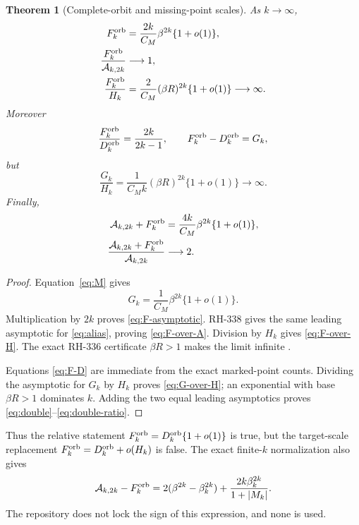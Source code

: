 \documentclass[11pt]{article}
\newtheorem{theorem}{Theorem}[section]
\theoremstyle{remark}
\newcommand{\cA}{\mathcal A}
\begin{document}
\begin{theorem}[Complete-orbit and missing-point scales]
\label{thm:scales}
As $k\to\infty$,
\begin{align}
 F_k^{\rm orb}
 &=\frac{2k}{C_M}\beta^{2k}\{1+o(1)\},
 \label{eq:F-asymptotic}\\
 \frac{F_k^{\rm orb}}{\cA_{k,2k}}&\longrightarrow1,
 \label{eq:F-over-A}\\
 \frac{F_k^{\rm orb}}{H_k}
 &=\frac2{C_M}(\beta R)^{2k}\{1+o(1)\}\longrightarrow\infty.
 \label{eq:F-over-H}
\end{align}
Moreover
\begin{equation}\label{eq:F-D}
 \frac{F_k^{\rm orb}}{D_k^{\rm orb}}=\frac{2k}{2k-1},
 \qquad F_k^{\rm orb}-D_k^{\rm orb}=G_k,
\end{equation}
but
\begin{equation}\label{eq:G-over-H}
 \frac{G_k}{H_k}
 =\frac1{C_Mk}(\beta R)^{2k}\{1+o(1)\}
 \longrightarrow\infty.
\end{equation}
Finally,
\begin{align}
 \cA_{k,2k}+F_k^{\rm orb}
 &=\frac{4k}{C_M}\beta^{2k}\{1+o(1)\},
 \label{eq:double}\\
 \frac{\cA_{k,2k}+F_k^{\rm orb}}{\cA_{k,2k}}
 &\longrightarrow2.
 \label{eq:double-ratio}
\end{align}
\end{theorem}

\begin{proof}
Equation~\eqref{eq:M} gives
\[
 G_k=\frac1{C_M}\beta^{2k}\{1+o(1)\}.
\]
Multiplication by $2k$ proves \eqref{eq:F-asymptotic}.  RH-338 gives the
same leading asymptotic for \eqref{eq:alias}, proving
\eqref{eq:F-over-A}.  Division by $H_k$ gives
\eqref{eq:F-over-H}.  The exact RH-336 certificate $\beta R>1$ makes the
limit infinite \citep{WangProjectorMass2026,WangFarAtom2026}.

Equations \eqref{eq:F-D} are immediate from the exact marked-point counts.
Dividing the asymptotic for $G_k$ by $H_k$ proves \eqref{eq:G-over-H}; an
exponential with base $\beta R>1$ dominates $k$.  Adding the two equal
leading asymptotics proves \eqref{eq:double}--\eqref{eq:double-ratio}.
\end{proof}

Thus the relative statement
$F_k^{\rm orb}=D_k^{\rm orb}\{1+o(1)\}$ is true, but the target-scale
replacement
$F_k^{\rm orb}=D_k^{\rm orb}+o(H_k)$ is false.  The exact finite-$k$
normalization also gives
\begin{equation}\label{eq:finite-relation}
 \cA_{k,2k}-F_k^{\rm orb}
 =2(\beta^{2k}-\beta_k^{2k})
 +\frac{2k\beta_k^{2k}}{1+|M_k|}.
\end{equation}
The repository does not lock the sign of this expression, and none is used.
\end{document}
